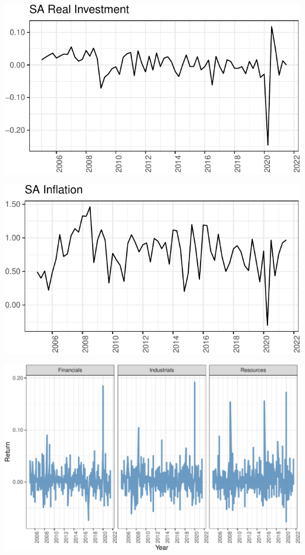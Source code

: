\documentclass[11pt,preprint, authoryear]{elsarticle}
\let\origfigure\figure
\let\endorigfigure\endfigure
\renewenvironment{figure}[1][2] {
    \expandafter\origfigure\expandafter[H]
} {
    \endorigfigure
}
\numberwithin{equation}{section}
\numberwithin{figure}{section}
\numberwithin{table}{section}
\begin{document}
\begin{figure}[H]
\includegraphics{Factor-Model_files/figure-latex/unnamed-chunk-9-1} \caption{South Africa Real Gross Fixed Capital Formation \label{Fig7}}\label{fig:unnamed-chunk-9}
\end{figure}

\begin{figure}[H]
\includegraphics{Factor-Model_files/figure-latex/unnamed-chunk-10-1} \caption{South Africa Consumer Price Inflation \label{Fig8}}\label{fig:unnamed-chunk-10}
\end{figure}

\begin{figure}[H]
\includegraphics{Factor-Model_files/figure-latex/unnamed-chunk-11-1} \caption{Asset Returns by Industry \label{Fig9}}\label{fig:unnamed-chunk-11}
\end{figure}
\end{document}
